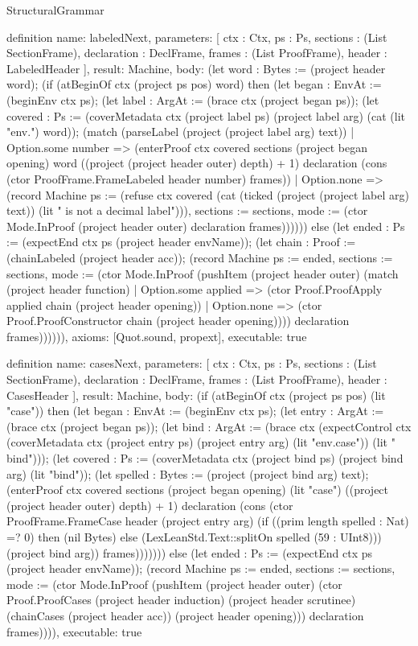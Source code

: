 \begin{lexlean}{StructuralGrammar}
\begin{semanticmodule}
{{definition{
  name: labeledNext,
  parameters: [
    ctx : Ctx,
    ps : Ps,
    sections : (List SectionFrame),
    declaration : DeclFrame,
    frames : (List ProofFrame),
    header : LabeledHeader
  ],
  result: Machine,
  body: (let word : Bytes := (project header word); (if (atBeginOf ctx (project ps pos) word) then (let began : EnvAt := (beginEnv ctx ps); (let label : ArgAt := (brace ctx (project began ps)); (let covered : Ps := (coverMetadata ctx (project label ps) (project label arg) (cat (lit "env.") word)); (match (parseLabel (project (project label arg) text))
    | Option.some number => (enterProof ctx covered sections (project began opening) word ((project (project header outer) depth) + 1) declaration (cons (ctor ProofFrame.FrameLabeled header number) frames))
    | Option.none => (record Machine {ps := (refuse ctx covered (cat (ticked (project (project label arg) text)) (lit " is not a decimal label"))), sections := sections, mode := (ctor Mode.InProof (project header outer) declaration frames)}))))) else (let ended : Ps := (expectEnd ctx ps (project header envName)); (let chain : Proof := (chainLabeled (project header acc)); (record Machine {ps := ended, sections := sections, mode := (ctor Mode.InProof (pushItem (project header outer) (match (project header function)
    | Option.some applied => (ctor Proof.ProofApply applied chain (project header opening))
    | Option.none => (ctor Proof.ProofConstructor chain (project header opening)))) declaration frames)}))))),
  axioms: [Quot.sound, propext],
  executable: true
}

definition{
  name: casesNext,
  parameters: [
    ctx : Ctx,
    ps : Ps,
    sections : (List SectionFrame),
    declaration : DeclFrame,
    frames : (List ProofFrame),
    header : CasesHeader
  ],
  result: Machine,
  body: (if (atBeginOf ctx (project ps pos) (lit "case")) then (let began : EnvAt := (beginEnv ctx ps); (let entry : ArgAt := (brace ctx (project began ps)); (let bind : ArgAt := (brace ctx (expectControl ctx (coverMetadata ctx (project entry ps) (project entry arg) (lit "env.case")) (lit "\\bind"))); (let covered : Ps := (coverMetadata ctx (project bind ps) (project bind arg) (lit "bind")); (let spelled : Bytes := (project (project bind arg) text); (enterProof ctx covered sections (project began opening) (lit "case") ((project (project header outer) depth) + 1) declaration (cons (ctor ProofFrame.FrameCase header (project entry arg) (if ((prim length spelled : Nat) =? 0) then (nil Bytes) else (LexLeanStd.Text::splitOn spelled (59 : UInt8))) (project bind arg)) frames))))))) else (let ended : Ps := (expectEnd ctx ps (project header envName)); (record Machine {ps := ended, sections := sections, mode := (ctor Mode.InProof (pushItem (project header outer) (ctor Proof.ProofCases (project header induction) (project header scrutinee) (chainCases (project header acc)) (project header opening))) declaration frames)}))),
  executable: true
}

}}
\end{semanticmodule}
\end{lexlean}
